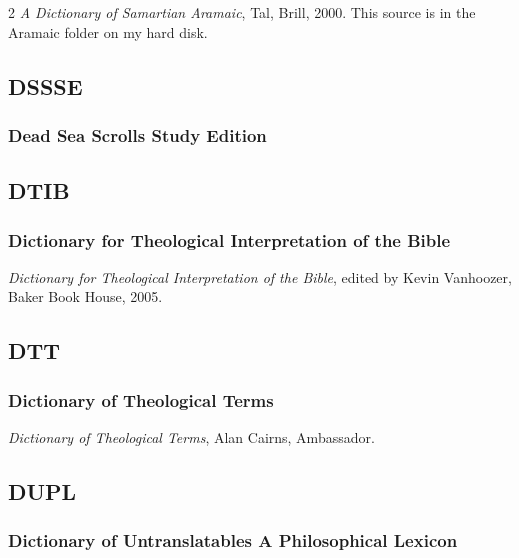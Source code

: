 \begin{multicols}{2}
			\textit{A Dictionary of Samartian Aramaic}, Tal, Brill, 2000. This source is in the Aramaic folder on my hard disk.
			
	\subsection*{DSSSE}
	
		\subsubsection*{Dead Sea Scrolls Study Edition}
		
			\phantom{.}
			
	\subsection*{DTIB}
	
		\subsubsection*{Dictionary for Theological Interpretation of the Bible}
		
			\textit{Dictionary for Theological Interpretation of the Bible}, edited by Kevin Vanhoozer, Baker Book House, 2005.
			
	\subsection*{DTT}
	
		\subsubsection*{Dictionary of Theological Terms}
		
			\textit{Dictionary of Theological Terms}, Alan Cairns, Ambassador.
			
	\subsection*{DUPL}
	
		\subsubsection*{Dictionary of Untranslatables A Philosophical Lexicon}
		

\end{multicols}
